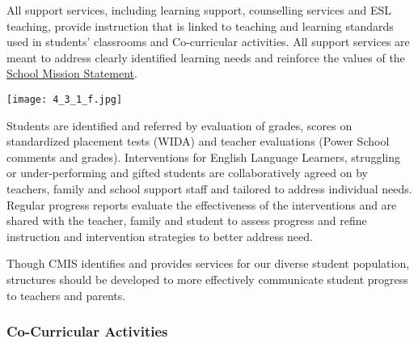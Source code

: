 

\begin{findings}
All support services, including learning support, counselling services and ESL teaching, provide instruction that is linked to teaching and learning standards used in students’ classrooms and Co-curricular activities. All support services are meant to address clearly identified learning needs and reinforce the values of the \href{http://cmis.ac.th/about/vision}{School Mission Statement}. 

{\centering\texttt{[image: 4\_3\_1\_f.jpg]}}

Students are identified and referred by evaluation of grades, scores on standardized placement tests (WIDA) and teacher evaluations (Power School comments and grades).  Interventions for English Language Learners, struggling or under-performing and gifted students are collaboratively agreed on by teachers, family and school support staff and tailored to address individual needs. Regular progress reports evaluate the effectiveness of the interventions and are shared with the teacher, family and student to assess progress and refine instruction and intervention strategies to better address need.


Though CMIS identifies and provides services for our diverse student population, structures should be developed to more effectively communicate student progress to teachers and parents. 
\end{findings}

\subsubsection{Co-Curricular Activities}


